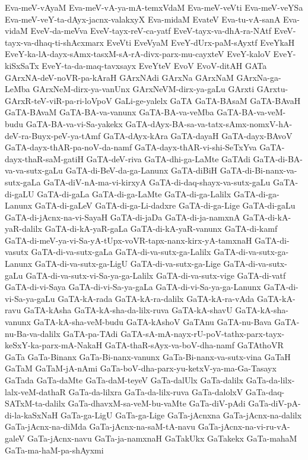 {Eva-meV-vAyaM
Eva-meV-vA-ya-mA-temxVdaM
Eva-meV-veVti
Eva-meV-veYSa
Eva-meV-veY-ta-dAyx-jacnx-valakxyX
Eva-midaM
EvateV
Eva-tu-vA-sanA
Eva-vidaM
EveV-da-meVva
EveV-tayx-reV-ca-yatf
EveV-tayx-va-dhA-ra-NAtf
EveV-tayx-va-dhaq-ti-shAcxmarx
EveVti
EveVyaM
EveY-dUrx-paM-sAyxtf
EveYkaH
EveY-ka-lA-dayx-sAmx-tasxM-sA-rA-divx-parx-mu-cayxteV
EveY-kaloV
EveY-kiSxSaTx
EveY-ta-da-maq-tavxsayx
EveYteV
EvoV
EvoV-ditAH
GATa
GArxNA-deV-noVR-pa-kAraH
GArxNAdi
GArxNa
GArxNaM
GArxNa-ga-LeMba
GArxNeM-dirx-ya-vanUnx
GArxNeVM-dirx-ya-gaLu
GArxti
GArxtu-GArxR-teV-viR-pa-ri-loVpoV
GaLi-ge-yalelx
GaTA
GaTA-BAsaM
GaTA-BAvaH
GaTA-BAvaM
GaTA-BA-va-vanunx
GaTA-BA-va-veMba
GaTA-BA-va-veM-budu
GaTA-BA-va-vi-Sa-yakekx
GaTA-dAyx-BA-sa-va-tatx-sAmx-nomxV-hA-deV-ra-Buyx-peV-ya-tAmf
GaTA-dAyx-kAra
GaTA-dayaH
GaTA-dayx-BAvoV
GaTA-dayx-thAR-pa-noV-da-namf
GaTA-dayx-thAR-vi-shi-SeTxYva
GaTA-dayx-thaR-saM-gatiH
GaTA-deV-riva
GaTA-dhi-ga-LaMte
GaTAdi
GaTA-di-BA-va-va-sutx-gaLu
GaTA-di-BeV-da-ga-Lanunx
GaTA-diBiH
GaTA-di-Bi-nanx-va-sutx-gaLa
GaTA-diV-nA-ma-vi-kirxyA
GaTA-di-daq-shayx-va-sutx-gaLu
GaTA-di-gaLU
GaTA-di-gaLa
GaTA-di-ga-LaMte
GaTA-di-ga-Lalilx
GaTA-di-ga-Lanunx
GaTA-di-gaLeV
GaTA-di-ga-Li-dadxre
GaTA-di-ga-Lige
GaTA-di-gaLu
GaTA-di-jAcnx-na-vi-SayaH
GaTA-di-jaDa
GaTA-di-ja-namxnA
GaTA-di-kA-yaR-dalilx
GaTA-di-kA-yaR-gaLa
GaTA-di-kA-yaR-vanunx
GaTA-di-kamf
GaTA-di-meV-ya-vi-Sa-yA-tUpx-voVR-tapx-nanx-kirx-yA-tamxnaH
GaTA-di-vasutx
GaTA-di-va-sutx-gaLa
GaTA-di-va-sutx-ga-Lalilx
GaTA-di-va-sutx-ga-Lanunx
GaTA-di-va-sutx-ga-LigU
GaTA-di-va-sutx-ga-Lige
GaTA-di-va-sutx-gaLu
GaTA-di-va-sutx-vi-Sa-ya-ga-Lalilx
GaTA-di-va-sutx-vige
GaTA-di-vatf
GaTA-di-vi-Saya
GaTA-di-vi-Sa-ya-gaLa
GaTA-di-vi-Sa-ya-ga-Lanunx
GaTA-di-vi-Sa-ya-gaLu
GaTA-kA-rada
GaTA-kA-ra-dalilx
GaTA-kA-ra-vAda
GaTA-kA-ravu
GaTA-kAsha
GaTA-kA-sha-da-lilx-ruva
GaTA-kA-shavU
GaTA-kA-sha-vanunx
GaTA-kA-sha-veM-budu
GaTA-kAshoV
GaTAnu
GaTA-nu-Bava
GaTA-nu-Ba-va-dalilx
GaTA-pa-TAdi
GaTA-sA-mA-nayx-rU-poV-tathx-parx-tayx-keSxY-ka-parx-mA-NakaH
GaTA-thaR-sAyx-va-boV-dha-namf
GaTAthoVR
GaTa
GaTa-Binanx
GaTa-Bi-nanx-vanunx
GaTa-Bi-nanx-va-sutx-vina
GaTaH
GaTaM
GaTaM-jA-nAmi
GaTa-boV-dha-parx-yu-ketxV-ya-ma-Ga-Tasayx
GaTada
GaTa-daMte
GaTa-daM-teyeV
GaTa-dalUlx
GaTa-dalilx
GaTa-da-lilx-lalx-veM-dathaR
GaTa-da-lilxra
GaTa-da-lilx-ruva
GaTa-dalolxV
GaTa-daq-SATxM-ta-dalilx
GaTa-dhavxM-sa-veM-bu-vaMte
GaTa-diV-pAdi
GaTa-diV-pA-di-la-kaSxNaH
GaTa-ga-LigU
GaTa-ga-Lige
GaTa-jAcnxna
GaTa-jAcnx-na-dalilx
GaTa-jAcnx-na-diMda
GaTa-jAcnx-na-saM-tA-navu
GaTa-jAcnx-na-vi-ru-vA-galeV
GaTa-jAcnx-navu
GaTa-ja-namxnaH
GaTakUkx
GaTakekx
GaTa-mahaM
GaTa-ma-haM-pa-shAyxmi
}
